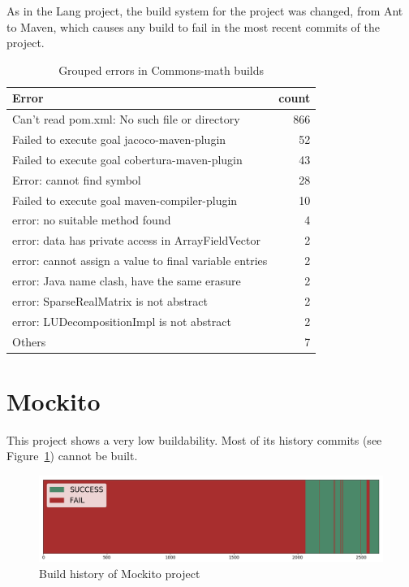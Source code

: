As in the Lang project, the build system for the project was changed, from Ant to Maven, which causes any build to fail in the most recent commits of the project.

\begin{table}[h]
	\caption{Grouped errors in Commons-math builds}
	\label{table:mathErrors}
	\begin{center}
	\begin{tabular}{lr}
		\toprule
		\bf{Error} & \bf{count} \\ 
		\midrule
		Can't read pom.xml: No such file or directory & 866 \\
		Failed to execute goal jacoco-maven-plugin & 52 \\
		Failed to execute goal cobertura-maven-plugin & 43 \\
		Error: cannot find symbol & 28 \\
		Failed to execute goal maven-compiler-plugin & 10 \\
		error: no suitable method found & 4 \\
		error: data has private access in ArrayFieldVector & 2 \\
		error: cannot assign a value to final variable entries & 2 \\
		error: Java name clash, have the same erasure & 2 \\
		error: SparseRealMatrix is not abstract & 2 \\
		error: LUDecompositionImpl is not abstract & 2 \\
		Others & 7 \\
		\bottomrule
	\end{tabular}
	\end{center}
\end{table}

\section{Mockito}

This project shows a very low buildability.
Most of its history commits (see Figure~\ref{fig:mockitoHist}) cannot be built.

\begin{figure}[h]
	\begin{center}
		\includegraphics[width=\linewidth]{img/charts/MockitoHist}
		\caption{Build history of Mockito project}
		\label{fig:mockitoHist}
	\end{center}
\end{figure}

